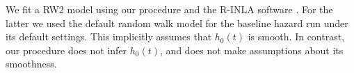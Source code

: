 \documentclass[num-refs,serif,10pt]{wiley-article}
\begin{document}
We fit a RW2 model using our procedure and the R-INLA software \cite{inla}. For the latter we used the default random walk model for the baseline hazard run under its default settings. This implicitly assumes that $h_{0}(t)$ is smooth. In contrast, our procedure does not infer $h_{0}(t)$, and does not make assumptions about its smoothness.

\begin{figure}[ht]
\centering
{}
\end{figure}
\end{document}
